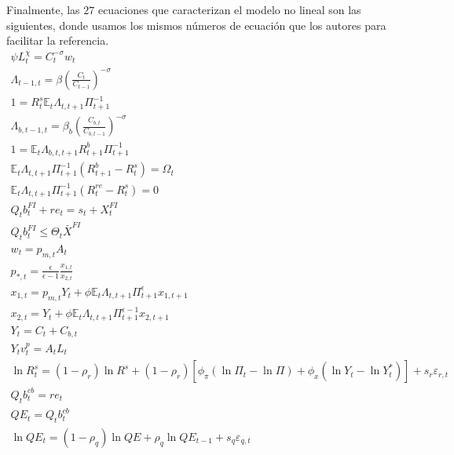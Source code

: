 \documentclass[../../entrega.tex]{subfiles}
\begin{document}
Finalmente, las $27$ ecuaciones que caracterizan el modelo no lineal son las siguientes, donde usamos los mismos números de ecuación que los autores para facilitar la referencia.
\begin{gather}
    \psi L_t^\chi = C_t^{-\sigma} w_t \label{eq:2-5} \tag{2.5} \\
    \Lambda_{t-1,t} = \beta\left(\frac{C_t}{C_{t-1}}\right)^{-\sigma} \label{eq:2-6} \tag{2.6} \\
    1 = R_t^s \mathbb{E}_t \Lambda_{t,t+1} \Pi_{t+1}^{-1} \label{eq:2-7} \tag{2.7} \\
    \Lambda_{b,t-1,t} = \beta_b\left(\frac{C_{b,t}}{C_{b,t-1}}\right)^{-\sigma} \label{eq:2-13} \tag{2.13} \\
    1 = \mathbb{E}_t \Lambda_{b,t,t+1} R_{t+1}^b \Pi_{t+1}^{-1} \label{eq:2-14} \tag{2.14} \\
    \mathbb{E}_t \Lambda_{t,t+1} \Pi_{t+1}^{-1}(R_{t+1}^b - R_t^s) = \Omega_t \label{eq:2-19} \tag{2.19} \\
    \mathbb{E}_t \Lambda_{t,t+1} \Pi_{t+1}^{-1}(R_t^{re} - R_t^s) = 0 \label{eq:2-20} \tag{2.20} \\
    Q_t b_t^{FI} + re_t = s_t + X_t^{FI} \label{eq:a-6} \tag{A.6} \\
    Q_t b_t^{FI} \leq \Theta_t \bar{X}^{FI} \label{eq:a-7} \tag{A.7} \\
    w_t = p_{m,t}A_t \label{eq:2-27} \tag{2.27} \\
    p_{*, t}=\frac{\epsilon}{\epsilon-1} \frac{x_{1, t}}{x_{2, t}} \label{eq:a-1} \tag{A.1}\\
    x_{1, t}=p_{m, t} Y_{t}+\phi \mathbb{E}_{t} \Lambda_{t, t+1} \Pi_{t+1}^{\epsilon} x_{1, t+1}  \label{eq:a-2}\tag{A.2}\\
    x_{2, t}=Y_{t}+\phi \mathbb{E}_{t} \Lambda_{t, t+1} \Pi_{t+1}^{\epsilon-1} x_{2, t+1} \label{eq:a-3} \tag{A.3}\\
    Y_{t}=C_{t}+C_{b, t} \label{eq:2-30}\tag{2.30}\\
    Y_{t} v_{t}^{p}=A_{t} L_{t} \label{eq:2-31}\tag{2.31}\\
    \ln R_{t}^{s}=\left(1-\rho_{r}\right) \ln R^{s}+\left(1-\rho_{r}\right)\left[\phi_{\pi}\left(\ln \Pi_{t}-\ln \Pi\right)+\phi_{x}\left(\ln Y_{t}-\ln Y_{t}^{*}\right)\right]+s_{r} \varepsilon_{r, t}  \label{eq:a-14}\tag{A.14}\\
    Q_{t} b_{t}^{c b}=r e_{t} \label{eq:a-8}\tag{A.8}\\
    QE_t = Q_t b_t^{cb} \label{eq:a-10}\tag{A.10}\\
    \ln Q E_{t}=\left(1-\rho_{q}\right) \ln Q E+\rho_{q} \ln Q E_{t-1}+s_{q} \varepsilon_{q, t} \label{eq:a-15}\tag{A.15}\\

\end{gather}
\end{document}

